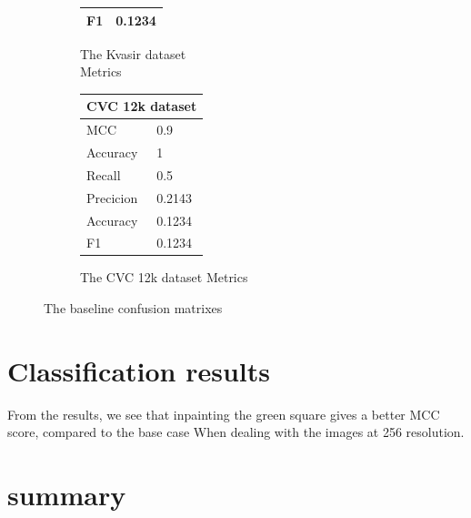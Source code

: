 \begin{figure}[h]
\begin{subfigure}[b]{0.49\textwidth}
\begin{tabular}{ll}
        F1                                     & 0.1234\\
        \bottomrule
\end{tabular}
\caption{The Kvasir dataset\\ Metrics}
\label{tab:kvasir_metrics_base}
\end{subfigure}%
\begin{subfigure}[b]{0.25\textwidth}
        \begin{tabular}{ll}
        \toprule
        \multicolumn{2}{c}{CVC 12k dataset}        \\
        \midrule
        MCC & 0.9    \\
        Accuracy                         & 1      \\
        Recall                              & 0.5    \\
        Precicion                        & 0.2143 \\
        Accuracy                        & 0.1234 \\
        F1                                     & 0.1234\\
        \bottomrule
        \end{tabular}
\caption{The CVC 12k dataset Metrics}
\label{tab:cvc12k_metrics_base}
\end{subfigure}
\caption{The baseline confusion matrixes}
\label{fig:BaselineCM}
\end{figure}

\FloatBarrier

\section{Classification results}
From the results, we see that inpainting the green square gives a better MCC score, compared to the base case When dealing with the images at 256 resolution. 



   
 



\section{summary}















